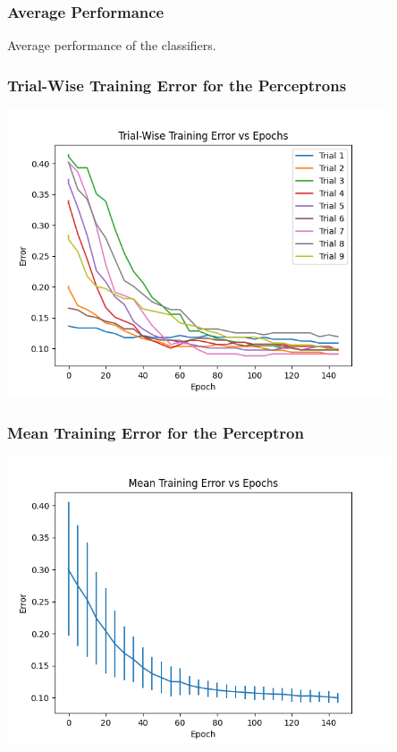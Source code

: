 \documentclass[a4paper, 11pt, titlepage]{article}
\begin{document}
  \subsubsection{Average Performance}
  \begin{table}[h]
    \caption{Average performance of the classifiers.}
    \begin{center}
    \end{center}
    \label{tab:avg_perf}
  \end{table}
  \subsubsection{Trial-Wise Training Error for the Perceptrons}
  \par \includegraphics[width=0.85\textwidth]{images/trial_wise_error.png}
  \subsubsection{Mean Training Error for the Perceptron}
  \par \includegraphics[width=0.85\textwidth]{images/mean_error.png}
\end{document}
